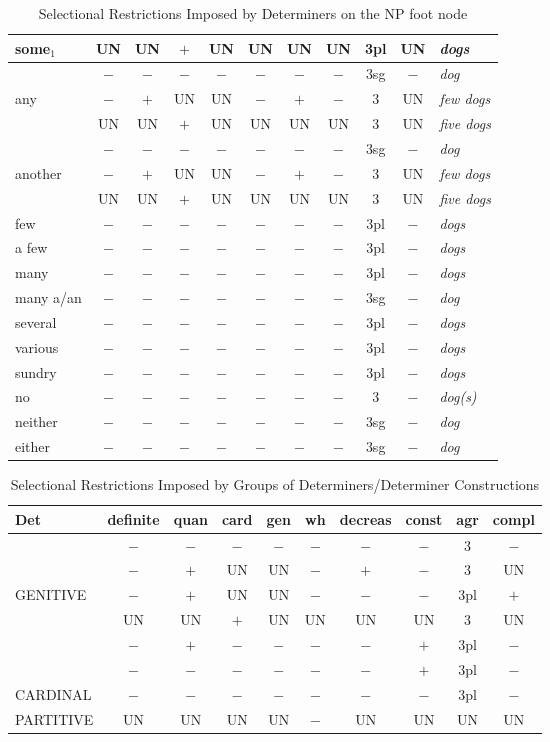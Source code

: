 \begin{table}
\begin{tabular}{|l||c|c|c|c|c|c|c|c|c||l|}
some$_{1}$&UN&UN&$+$&UN&UN&UN&UN&3pl&UN&{\it dogs}\\
\hline
&$-$&$-$&$-$&$-$&$-$&$-$&$-$&3sg&$-$&{\it dog}\\
any&$-$&$+$&UN&UN&$-$&$+$&$-$&3&UN&{\it few dogs}\\
&UN&UN&$+$&UN&UN&UN&UN&3&UN&{\it five dogs}\\
\hline
&$-$&$-$&$-$&$-$&$-$&$-$&$-$&3sg&$-$&{\it dog}\\
another&$-$&$+$&UN&UN&$-$&$+$&$-$&3&UN&{\it few dogs}\\
&UN&UN&$+$&UN&UN&UN&UN&3&UN&{\it five dogs}\\
\hline
few&$-$&$-$&$-$&$-$&$-$&$-$&$-$&3pl&$-$&{\it dogs}\\
\hline
a few&$-$&$-$&$-$&$-$&$-$&$-$&$-$&3pl&$-$&{\it dogs}\\
\hline
many&$-$&$-$&$-$&$-$&$-$&$-$&$-$&3pl&$-$&{\it dogs}\\
\hline
many a/an&$-$&$-$&$-$&$-$&$-$&$-$&$-$&3sg&$-$&{\it dog}\\
\hline
several&$-$&$-$&$-$&$-$&$-$&$-$&$-$&3pl&$-$&{\it dogs}\\
\hline
various&$-$&$-$&$-$&$-$&$-$&$-$&$-$&3pl&$-$&{\it dogs}\\
\hline
sundry&$-$&$-$&$-$&$-$&$-$&$-$&$-$&3pl&$-$&{\it dogs}\\
\hline
no&$-$&$-$&$-$&$-$&$-$&$-$&$-$&3&$-$&{\it dog(s)}\\
\hline
neither&$-$&$-$&$-$&$-$&$-$&$-$&$-$&3sg&$-$&{\it dog}\\
\hline
either&$-$&$-$&$-$&$-$&$-$&$-$&$-$&3sg&$-$&{\it dog}\\
\hline
\end{tabular}
\caption{Selectional Restrictions Imposed by Determiners on the NP
foot node}
\label{det-ordering}
\end{table}

\begin{table}[htb]
\centering
\begin{tabular}{|l||c|c|c|c|c|c|c|c|c|}
\hline\hline
Det&definite&quan&card&gen&wh&decreas&const&agr&compl\\
\hline
\hline
&$-$&$-$&$-$&$-$&$-$&$-$&$-$&3&$-$\\
&$-$&$+$&UN&UN&$-$&$+$&$-$&3&UN\\
GENITIVE&$-$&$+$&UN&UN&$-$&$-$&$-$&3pl&$+$\\
&UN&UN&$+$&UN&UN&UN&UN&3&UN\\
&$-$&$+$&$-$&$-$&$-$&$-$&$+$&3pl&$-$\\
&$-$&$-$&$-$&$-$&$-$&$-$&$+$&3pl&$-$\\
\hline
CARDINAL&$-$&$-$&$-$&$-$&$-$&$-$&$-$&3pl\footnotemark&$-$\\
\hline
PARTITIVE&UN&UN&UN&UN&$-$&UN&UN&UN&UN\\
\hline
\end{tabular}
\caption{Selectional Restrictions Imposed by Groups of
Determiners/Determiner Constructions}
\label{det-ordering2}
\end{table}



